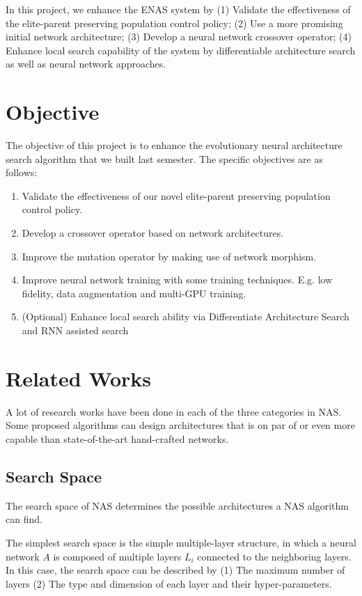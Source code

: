 \documentclass{article}
\begin{document}
\begin{normalsize}
     In this project, we enhance the ENAS system by (1) Validate the effectiveness of the elite-parent preserving population control policy; (2) Use a more promising initial network architecture; (3) Develop a neural network crossover operator; (4) Enhance local search capability of the system by differentiable architecture search as well as neural network approaches.
  
   \section{Objective}

   The objective of this project is to enhance the evolutionary neural architecture search algorithm that we built last semester. The specific objectives are as follows:
   \begin{enumerate}
     \item Validate the effectiveness of our novel elite-parent preserving population control policy.
     \item Develop a crossover operator based on network architectures.
     \item Improve the mutation operator by making use of network morphism.
     \item Improve neural network training with some training techniques. E.g. low fidelity, data augmentation and multi-GPU training.
     \item (Optional) Enhance local search ability via Differentiate Architecture Search \cite{liu2018darts} and RNN assisted search\cite{zoph2018learning}
   \end{enumerate}

   \section{Related Works}
   A lot of research works have been done in each of the three categories in NAS\@. Some proposed algorithms can design architectures that is on par of or even more capable than state-of-the-art hand-crafted networks.
   
   \subsection{Search Space}
   
   The search space of NAS determines the possible architectures a NAS algorithm can find.

   The simplest search space is the simple multiple-layer structure, in which a neural network $A$ is composed of multiple layers $L_i$ connected to the neighboring layers. In this case, the search space can be described by (1) The maximum number of layers (2) The type and dimension of each layer and their hyper-parameters\cite{chollet2017xception}\cite{baker2016designing}. 


\end{normalsize}
\end{document}

